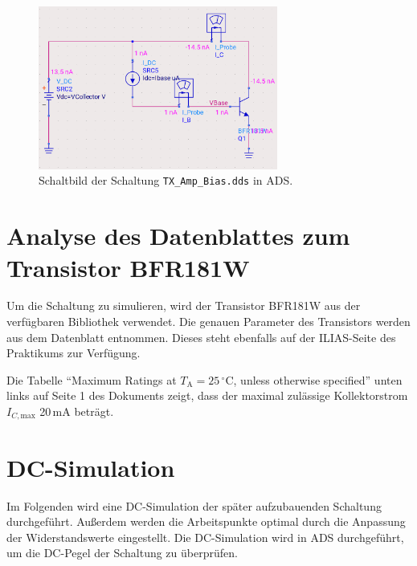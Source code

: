 \begin{figure}[h]
    \centering
    \includegraphics[width=0.7\textwidth]{Pictures/TX_BIAS.png}
    \caption{Schaltbild der Schaltung \texttt{TX\_Amp\_Bias.dds} in \ac{ADS}.}
    \label{fig:TX_BIAS}
\end{figure}

\section{Analyse des Datenblattes zum Transistor BFR181W}
Um die Schaltung zu simulieren, wird der Transistor BFR181W aus der verfügbaren Bibliothek verwendet. Die genauen Parameter des Transistors werden aus dem Datenblatt entnommen.
Dieses steht ebenfalls auf der ILIAS-Seite des Praktikums zur Verfügung.

Die Tabelle \enquote{Maximum Ratings at $T_\mathrm{A}=25\,^\circ\mathrm{C}$, unless otherwise specified} unten links auf Seite 1 des Dokuments zeigt, dass der maximal zulässige Kollektorstrom $I_{C,\mathrm{max}}$ 20\,mA beträgt.

\section{DC-Simulation}
Im Folgenden wird eine DC-Simulation der später aufzubauenden Schaltung durchgeführt. 
Außerdem werden die Arbeitspunkte optimal durch die Anpassung der Widerstandswerte eingestellt.
Die DC-Simulation wird in \ac{ADS} durchgeführt, um die DC-Pegel der Schaltung zu überprüfen.


